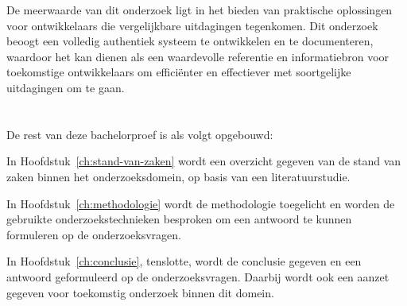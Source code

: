 De meerwaarde van dit onderzoek ligt in het bieden van praktische oplossingen voor ontwikkelaars die vergelijkbare uitdagingen tegenkomen. Dit onderzoek beoogt een volledig authentiek systeem te ontwikkelen en te documenteren, waardoor het kan dienen als een waardevolle referentie en informatiebron voor toekomstige ontwikkelaars om efficiënter en effectiever met soortgelijke uitdagingen om te gaan.

\section{}%
\label{sec:opzet-bachelorproef}


De rest van deze bachelorproef is als volgt opgebouwd:

In Hoofdstuk~\ref{ch:stand-van-zaken} wordt een overzicht gegeven van de stand van zaken binnen het onderzoeksdomein, op basis van een literatuurstudie.

In Hoofdstuk~\ref{ch:methodologie} wordt de methodologie toegelicht en worden de gebruikte onderzoekstechnieken besproken om een antwoord te kunnen formuleren op de onderzoeksvragen.


In Hoofdstuk~\ref{ch:conclusie}, tenslotte, wordt de conclusie gegeven en een antwoord geformuleerd op de onderzoeksvragen. Daarbij wordt ook een aanzet gegeven voor toekomstig onderzoek binnen dit domein.